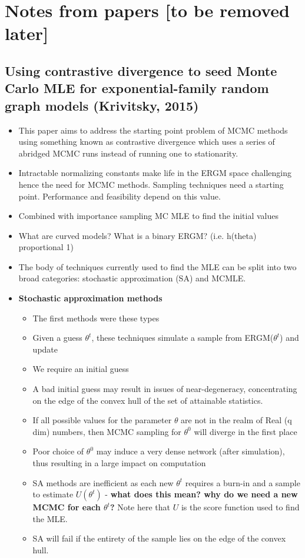 \section{Notes from papers [to be removed later]}

\subsection{Using contrastive divergence to seed Monte Carlo MLE for exponential-family
random graph models (Krivitsky, 2015)}

\begin{itemize}

    \item This paper aims to address the starting point problem of MCMC methods using something known as contrastive divergence which uses a series of abridged MCMC runs instead of running one to stationarity.
    \item Intractable normalizing constants make life in the ERGM space challenging hence the need for MCMC methods. Sampling techniques need a starting point. Performance and feasibility depend on this value.
    \item Combined with importance sampling MC MLE to find the initial values
    \item What are curved models? What is a binary ERGM? (i.e. h(theta) proportional 1)
    \item The body of techniques currently used to find the MLE can be split into two broad categories: stochastic approximation (SA) and MCMLE.
    \item \textbf{Stochastic approximation methods}
    \begin{itemize}
        \item The first methods were these types
        \item Given a guess $\theta^{t}$, these techniques simulate a sample from ERGM($\theta^{t}$) and update
        \item We require an initial guess
        \item A bad initial guess may result in issues of near-degeneracy, concentrating on the edge of the convex hull of the set of attainable statistics.
        \item If all possible values for the parameter $\theta$ are not in the realm of Real (q dim) numbers, then MCMC sampling for $\theta^{0}$ will diverge in the first place
        \item Poor choice of $\theta^{0}$ may induce a very dense network (after simulation), thus resulting in a large impact on computation
        \item SA methods are inefficient as each new $\theta^{t}$ requires a burn-in and a sample to estimate $U(\theta^{t})$ - \textbf{what does this mean? why do we need a new MCMC for each $\theta^{t}$?} Note here that $U$ is the score function used to find the MLE.
        \item SA will fail if the entirety of the sample lies on the edge of the convex hull.
    \end{itemize}


\end{itemize}

